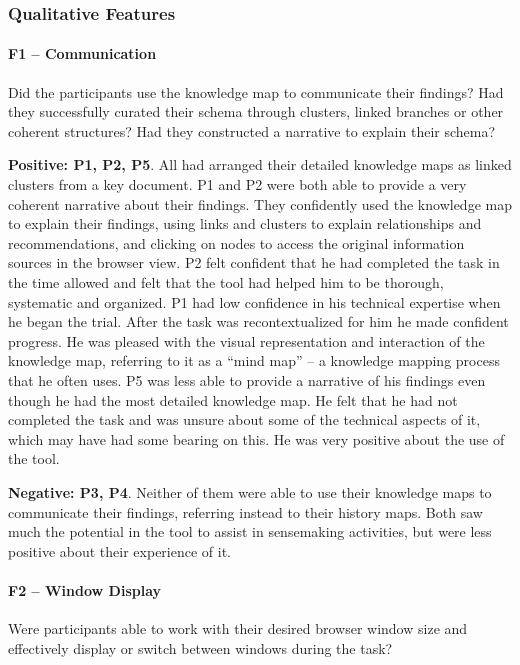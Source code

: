 \subsubsection{Qualitative Features}

\paragraph{F1 -- Communication}
Did the participants use the knowledge map to communicate their findings? Had they successfully curated their schema through clusters, linked branches or other coherent structures? Had they constructed a narrative to explain their schema?

\textbf{Positive: P1, P2, P5}. All had arranged their detailed knowledge maps as linked clusters from a key document. P1 and P2 were both able to provide a very coherent narrative about their findings. They confidently used the knowledge map to explain their findings, using links and clusters to explain relationships and recommendations, and clicking on nodes to access the original information sources in the browser view. P2 felt confident that he had completed the task in the time allowed and felt that the tool had helped him to be thorough, systematic and organized. P1 had low confidence in his technical expertise when he began the trial. After the task was recontextualized for him he made confident progress. He was pleased with the visual representation and interaction of the knowledge map, referring to it as a ``mind map'' -- a knowledge mapping process that he often uses. P5 was less able to provide a narrative of his findings even though he had the most detailed knowledge map. He felt that he had not completed the task and was unsure about some of the technical aspects of it, which may have had some bearing on this. He was very positive about the use of the tool.

\textbf{Negative: P3, P4}. Neither of them were able to use their knowledge maps to communicate their findings, referring instead to their history maps. Both saw much the potential in the tool to assist in sensemaking activities, but were less positive about their experience of it.

\paragraph{F2 -- Window Display}
Were participants able to work with their desired browser window size and effectively display or switch between windows during the task?

